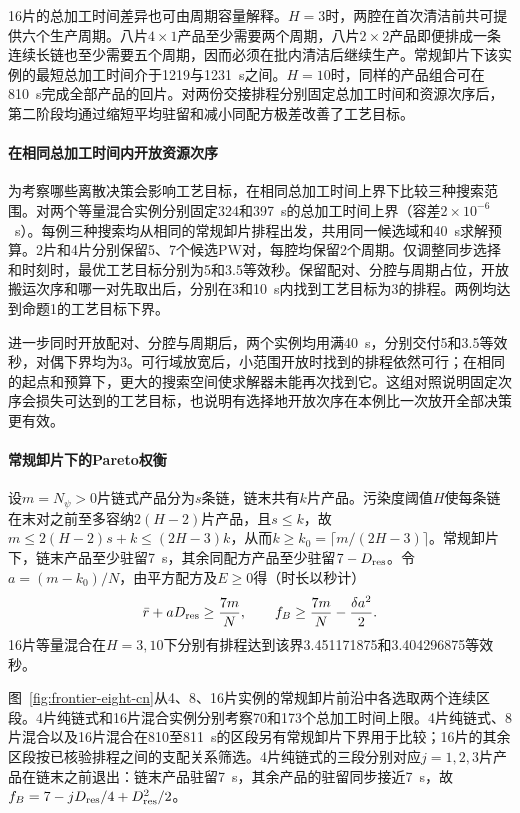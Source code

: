 \documentclass[final,5p,times,twocolumn]{elsarticle}
\begin{document}
16片的总加工时间差异也可由周期容量解释。$H=3$时，两腔在首次清洁前共可提供六个生产周期。八片$4\times1$产品至少需要两个周期，八片$2\times2$产品即便排成一条连续长链也至少需要五个周期，因而必须在批内清洁后继续生产。常规卸片下该实例的最短总加工时间介于1219与1231~s之间。$H=10$时，同样的产品组合可在810~s完成全部产品的回片。对两份交接排程分别固定总加工时间和资源次序后，第二阶段均通过缩短平均驻留和减小同配方极差改善了工艺目标。

\paragraph{在相同总加工时间内开放资源次序}
为考察哪些离散决策会影响工艺目标，在相同总加工时间上界下比较三种搜索范围。对两个等量混合实例分别固定324和397~s的总加工时间上界（容差$2\times10^{-6}$~s）。每例三种搜索均从相同的常规卸片排程出发，共用同一候选域和40~s求解预算。2片和4片分别保留5、7个候选PW对，每腔均保留2个周期。仅调整同步选择和时刻时，最优工艺目标分别为5和3.5等效秒。保留配对、分腔与周期占位，开放搬运次序和哪一对先取出后，分别在3和10~s内找到工艺目标为3的排程。两例均达到命题1的工艺目标下界。

进一步同时开放配对、分腔与周期后，两个实例均用满40~s，分别交付5和3.5等效秒，对偶下界均为3。可行域放宽后，小范围开放时找到的排程依然可行；在相同的起点和预算下，更大的搜索空间使求解器未能再次找到它。这组对照说明固定次序会损失可达到的工艺目标，也说明有选择地开放次序在本例比一次放开全部决策更有效。

\paragraph{常规卸片下的Pareto权衡}
设$m=N_\psi>0$片链式产品分为$s$条链，链末共有$k$片产品。污染度阈值$H$使每条链在末对之前至多容纳$2(H-2)$片产品，且$s\le k$，故$m\le2(H-2)s+k\le(2H-3)k$，从而$k\ge k_0=\lceil m/(2H-3)\rceil$。常规卸片下，链末产品至少驻留7~s，其余同配方产品至少驻留$7-D_{\rm res}$。令$a=(m-k_0)/N$，由平方配方及$E\ge0$得（时长以秒计）
\[
\bar r+aD_{\rm res}\ge\frac{7m}{N},
\qquad
f_B\ge\frac{7m}{N}-\frac{\delta a^2}{2}.
\]
16片等量混合在$H=3,10$下分别有排程达到该界3.451171875和3.404296875等效秒。

图~\ref{fig:frontier-eight-cn}从4、8、16片实例的常规卸片前沿中各选取两个连续区段。4片纯链式和16片混合实例分别考察70和173个总加工时间上限。4片纯链式、8片混合以及16片混合在810至811~s的区段另有常规卸片下界用于比较；16片的其余区段按已核验排程之间的支配关系筛选。4片纯链式的三段分别对应$j=1,2,3$片产品在链末之前退出：链末产品驻留7~s，其余产品的驻留同步接近7~s，故$f_B=7-jD_{\rm res}/4+D_{\rm res}^2/2$。
\end{document}
